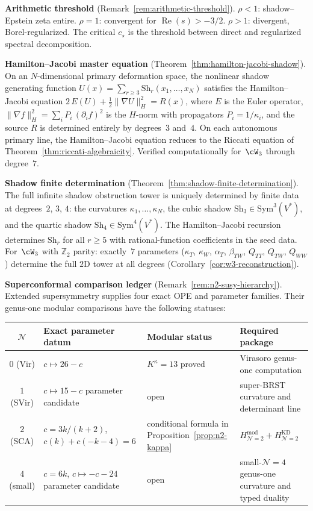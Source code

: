 \smallskip\noindent\textbf{Arithmetic threshold}
(Remark~\ref{rem:arithmetic-threshold}).
$\rho < 1$: shadow--Epstein zeta entire.
$\rho = 1$: convergent for $\operatorname{Re}(s) > -3/2$.
$\rho > 1$: divergent, Borel-regularized.
The critical $c_\star$ is the threshold between
direct and regularized spectral decomposition.

\smallskip\noindent\textbf{Hamilton--Jacobi master equation}
(Theorem~\ref{thm:hamilton-jacobi-shadow}).
On an $N$-dimensional primary deformation space, the nonlinear
shadow generating function
$U(x) = \sum_{r \geq 3} \mathrm{Sh}_r(x_1, \dotsc, x_N)$
satisfies the Hamilton--Jacobi equation
$2\,E(U) + \frac{1}{2}\|\nabla U\|_H^2 = R(x)$,
where $E$ is the Euler operator,
$\|\nabla f\|_H^2 = \sum_i P_i\,(\partial_i f)^2$
is the $H$-norm with propagators $P_i = 1/\kappa_i$,
and the source $R$ is determined entirely by degrees~$3$
and~$4$. On each autonomous primary line, the
Hamilton--Jacobi equation reduces to the Riccati equation of
Theorem~\ref{thm:riccati-algebraicity}. Verified
computationally for~$\cW_3$ through degree~$7$.

\smallskip\noindent\textbf{Shadow finite determination}
(Theorem~\ref{thm:shadow-finite-determination}).
The full infinite shadow obstruction tower is uniquely
determined by finite data at degrees~$2$, $3$, $4$:
the curvatures $\kappa_1, \dotsc, \kappa_N$, the cubic shadow
$\mathrm{Sh}_3 \in \mathrm{Sym}^3(V^*)$, and the quartic shadow
$\mathrm{Sh}_4 \in \mathrm{Sym}^4(V^*)$.
The Hamilton--Jacobi recursion determines
$\mathrm{Sh}_r$ for all $r \geq 5$ with rational-function
coefficients in the seed data. For~$\cW_3$ with
$\mathbb{Z}_2$ parity: exactly~$7$ parameters
($\kappa_T$, $\kappa_W$, $\alpha_T$, $\beta_{TW}$,
$Q_{TT}$, $Q_{TW}$, $Q_{WW}$) determine the full
$2$D tower at all degrees
(Corollary~\ref{cor:w3-reconstruction}).

\smallskip\noindent\textbf{Superconformal comparison ledger}
(Remark~\ref{rem:n2-susy-hierarchy}).
Extended supersymmetry supplies four exact OPE and parameter families.
Their genus-one modular comparisons have the following statuses:
\begin{center}
\small
\renewcommand{\arraystretch}{1.15}
\begin{tabular}{@{}c p{4.2cm} p{3.5cm} p{3.9cm}@{}}
\toprule
$\mathcal{N}$ & Exact parameter datum & Modular status & Required package \\
\midrule
$0$ (Vir) & $c\mapsto26-c$ & $K^\kappa=13$ proved & Virasoro genus-one computation \\
$1$ (SVir) & $c\mapsto15-c$ parameter candidate & open & super-BRST curvature and determinant line \\
$2$ (SCA) & $c=3k/(k+2)$, $c(k)+c(-k-4)=6$ &
conditional formula in Proposition~\ref{prop:n2-kappa} &
$H_{\mathcal N=2}^{\mathrm{mod}}+H_{\mathcal N=2}^{\mathrm{KD}}$ \\
$4$ (small) & $c=6k$, $c\mapsto-c-24$ parameter candidate & open &
small-$\mathcal N=4$ genus-one curvature and typed duality \\
\bottomrule
\end{tabular}
\end{center}

